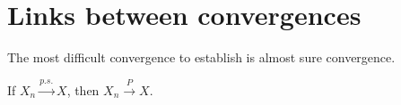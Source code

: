 \section{Links between convergences}%
The most difficult convergence to establish is almost sure convergence.%
\begin{proposition}
If $X_n \xrightarrow{p.s.} X$, then $X_n \xrightarrow{P} X$.
\end{proposition}%

